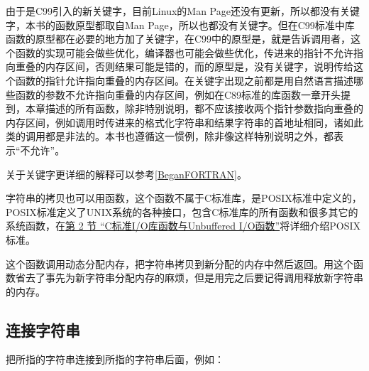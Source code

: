 \begin{BookNote}
由于是C99引入的新关键字，目前Linux的Man Page还没有更新，所以都没有关键字，本书的函数原型都取自Man Page，所以也都没有关键字。但在C99标准中库函数的原型都在必要的地方加了关键字，在C99中的原型是，就是告诉调用者，这个函数的实现可能会做些优化，编译器也可能会做些优化，传进来的指针不允许指向重叠的内存区间，否则结果可能是错的，而的原型是，没有关键字，说明传给这个函数的指针允许指向重叠的内存区间。在关键字出现之前都是用自然语言描述哪些函数的参数不允许指向重叠的内存区间，例如在C89标准的库函数一章开头提到，本章描述的所有函数，除非特别说明，都不应该接收两个指针参数指向重叠的内存区间，例如调用时传进来的格式化字符串和结果字符串的首地址相同，诸如此类的调用都是非法的。本书也遵循这一惯例，除非像这样特别说明之外，都表示“不允许”。



关于关键字更详细的解释可以参考\hyperlink{db.bi01.bibli.restrict}{[BeganFORTRAN]}。

\end{BookNote}


字符串的拷贝也可以用函数，这个函数不属于C标准库，是POSIX标准中定义的，POSIX标准定义了UNIX系统的各种接口，包含C标准库的所有函数和很多其它的系统函数，在\hyperlink{db.ch28s02.id2850574}{第 2 节 “C标准I/\BookSplit{}O库函数与Unbuffered I/\BookSplit{}O函数”}将详细介绍POSIX标准。




这个函数调用动态分配内存，把字符串拷贝到新分配的内存中然后返回。用这个函数省去了事先为新字符串分配内存的麻烦，但是用完之后要记得调用释放新字符串的内存。


\subsection{连接字符串}
%



把所指的字符串连接到所指的字符串后面，例如：


